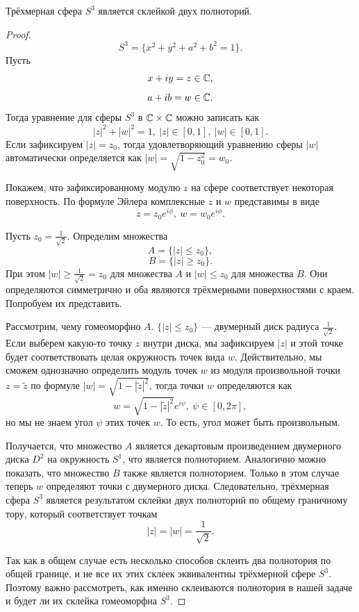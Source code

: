\begin{statement}
    Трёхмерная сфера $S^3$ является склейкой двух полноторий.
\end{statement} 
\begin{proof}
    \[S^3 = \{x^2+y^2+a^2+b^2=1\}.\]
    Пусть 
    \[x+iy = z \in \mathbb{C},\]
    \[a+ib = w \in \mathbb{C}.\]
    Тогда уравнение для сферы $S^3$ в $\mathbb{C} \times \mathbb{C}$ можно записать как
    \[|z|^2 + |w|^2 = 1, \ |z| \in [0,1], \ |w| \in [0,1].\]
    Если зафиксируем $|z| = z_0$, тогда удовлетворяющий уравнению сферы $|w|$ автоматически определяется как $|w| = \sqrt{1-z_0^2} = w_0$.

    Покажем, что зафиксированному модулю $z$ на сфере соответствует некоторая поверхность. По формуле Эйлера комплексные $z$ и $w$ представимы в виде 
    \[z = z_0 e^{i\phi}, \ w = w_0 e^{i\phi}.\]

    Пусть $z_0 = \frac{1}{\sqrt2}$. Определим множества 
    \[A = \{|z| \leqslant z_0\},\]
    \[B = \{|z| \geqslant z_0\}.\]
    При этом $|w| \geqslant \frac{1}{\sqrt2} = z_0$ для множества $A$ и $|w| \leqslant z_0$ для множества $B$. Они определяются симметрично и оба являются трёхмерными поверхностями с краем. Попробуем их представить.

    Рассмотрим, чему гомеоморфно $A$. $\{|z| \leqslant z_0\}$ — двумерный диск радиуса $\frac{1}{\sqrt2}$. Если выберем какую-то точку $z$ внутри диска, мы зафиксируем $|z|$ и этой точке будет соответствовать целая окружность точек вида $w$. Действительно, мы сможем однозначно определить модуль точек $w$ из модуля произвольной точки $z = \tilde{z}$ по формуле $|w| = \sqrt{1-|\tilde{z}|^2}$, тогда точки $w$ определяются как $$w = \sqrt{1-|\tilde{z}|^2} e^{i\psi}, \ \psi \in [0,2\pi],$$
    но мы не знаем угол $\psi$ этих точек $w$. То есть, угол может быть произвольным.

    Получается, что множество $A$ является декартовым произведением двумерного диска $D^2$ на окружность $S^1$, что является полноторием. Аналогично можно показать, что множество $B$ также является полноторием. Только в этом случае теперь $w$ определяют точки с двумерного диска. Следовательно, трёхмерная сфера $S^3$ является результатом склейки двух полноторий по общему граничному тору, который соответствует точкам 
    \[|z| = |w| = \frac{1}{\sqrt2}.\]

    Так как в общем случае есть несколько способов склеить два полнотория по общей границе, и не все их этих склеек эквивалентны трёхмерной сфере $S^3$. Поэтому важно рассмотреть, как именно склеиваются полнотория в нашей задаче и будет ли их склейка гомеоморфна $S^3$.


\end{proof}

